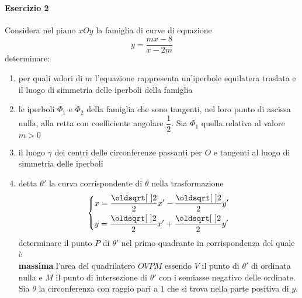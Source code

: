 \paragraph{Esercizio 2}
Considera nel piano $xOy$ la famiglia di curve di equazione
\begin{equation*}
y=\frac{mx-8}{x-2m}
\end{equation*}
determinare:
\begin{enumerate}
	\item per quali valori di $m$ l'equazione rappresenta un'iperbole equilatera traslata e il luogo
	di simmetria delle iperboli della famiglia \label{enum:ex:aff:2:1}
	\item le iperboli $\Phi_1$ e $\Phi_2$ della famiglia che sono tangenti, nel loro punto di ascissa
	nulla, alla retta con coefficiente angolare $\dfrac{1}{2}$. Sia $\Phi_1$ quella relativa al valore
	$m>0$ \label{enum:ex:aff:2:2}
	\item il luogo $\gamma$ dei centri delle circonferenze passanti per $O$ e tangenti al luogo
	di simmetria delle iperboli \label{enum:ex:aff:2:3}
	\item detta $\theta'$ la curva corrispondente di $\theta$ nella trasformazione
	\label{enum:ex:aff:2:4}
	\begin{equation*}
	\begin{dcases}
	x = \frac{\sqrt{2}}{2}x'-\frac{\sqrt{2}}{2}y'\\
	y = \frac{\sqrt{2}}{2}x'+\frac{\sqrt{2}}{2}y'
	\end{dcases}
	\end{equation*}
	determinare il punto $P$ di $\theta'$ nel primo quadrante in corrispondenza del quale è \\
	\textbf{massima} l'area del quadrilatero $OVPM$ essendo $V$ il punto di $\theta'$ di ordinata
	nulla e $M$ il punto di intersezione di $\theta'$ con i semiasse negativo delle ordinate.
	Sia $\theta$ la circonferenza con raggio pari a $1$ che si trova nella parte positiva di $y$.
\end{enumerate}
\divisor

